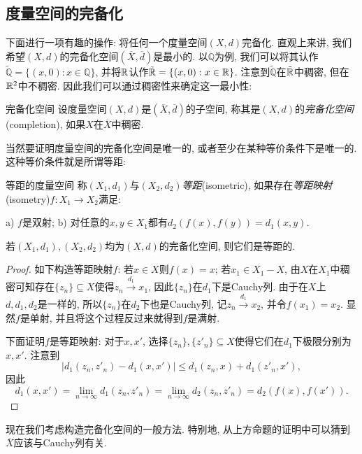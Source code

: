 \subsection{度量空间的完备化}

下面进行一项有趣的操作: 将任何一个度量空间$(X,d)$完备化. 直观上来讲, 我们希望$(X,d)$的完备化空间$(\overline{X},\overline{d})$是最小的. 以$\mathbb{Q}$为例, 我们可以将其认作$\tilde{\mathbb{Q}}=\{ (x,0):x \in \mathbb{Q} \}$, 并将$\mathbb{R}$认作$\tilde{\mathbb{R}}=\{ (x,0):x \in \mathbb{R} \}$. 注意到$\tilde{\mathbb{Q}}$在$\tilde{\mathbb{R}}$中稠密, 但在$\mathbb{R} ^2$中不稠密. 因此我们可以通过稠密性来确定这一最小性:

\begin{definition}{完备化空间}
	设度量空间$(X,d)$是$(\overline{X},\overline{d})$的子空间, 称其是$(X,d)$的\textit{完备化空间}(completion), 如果$X$在$\overline{X}$中稠密. 
\end{definition}

当然要证明度量空间的完备化空间是唯一的, 或者至少在某种等价条件下是唯一的. 这种等价条件就是所谓等距: 

\begin{definition}{等距的度量空间}
	称$(X_1,d_1)$与$(X_2,d_2)$\textit{等距}(isometric), 如果存在\textit{等距映射}(isometry)$f:X_1 \to X_2$满足: 
	
	a) $f$是双射; \qquad b) 对任意的$x,y \in X_1$都有$d_2(f(x),f(y))=d_1(x,y)$. 
\end{definition}

\begin{proposition}{}
	若$(X_1,d_1),(X_2,d_2)$均为$(X,d)$的完备化空间, 则它们是等距的. 
\end{proposition}
\begin{proof}
	如下构造等距映射$f$: 若$x \in X$则$f(x) = x$; 若$x_1 \in X_1-X$, 由$X$在$X_1$中稠密可知存在$\{ z_n \} \subseteq X$使得$z_n \stackrel{d_1}{\longrightarrow} x_1$, 因此$\{ z_n \}$在$d_1$下是Cauchy列. 由于在$X$上$d,d_1,d_2$是一样的, 所以$\{ z_n \}$在$d_2$下也是Cauchy列, 记$z_n \stackrel{d_1}{\longrightarrow} x_2$, 并令$f(x_1)=x_2$. 显然$f$是单射, 并且将这个过程反过来就得到$f$是满射. 
	
	下面证明$f$是等距映射: 对于$x,x'$, 选择$\{ z_n \},\{ z'_n \} \subseteq X$使得它们在$d_1$下极限分别为$x,x'$. 注意到$$|d_1(z_n,z'_n)-d_1(x,x')| \leq d_1(z_n,x) + d_1(z'_n,x'),$$
	因此$$d_1(x,x') = \lim_{n\to \infty} d_1(z_n,z'_n) = \lim_{n\to \infty} d_2(z_n,z'_n) = d_2(f(x),f(x')).$$
\end{proof}

现在我们考虑构造完备化空间的一般方法. 特别地, 从上方命题的证明中可以猜到$\overline{X}$应该与Cauchy列有关. 

